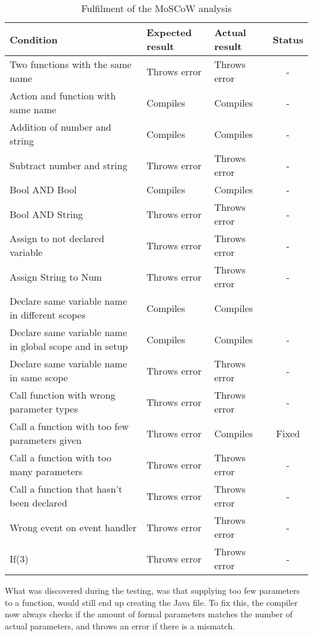 \begin{table}[H]
\centering
\begin{tabular}{ |p{4cm}|p{4cm}|p{4cm}|c| }
\hline
\textbf{Condition} & \textbf{Expected result} & \textbf{Actual result} & \textbf{Status} \\ \hline
Two functions with the same name & Throws error & Throws error & - \\ \hline
Action and function with same name & Compiles & Compiles & - \\ \hline
Addition of number and string & Compiles & Compiles & - \\ \hline
Subtract number and string & Throws error & Throws error & - \\ \hline
Bool AND Bool & Compiles & Compiles & - \\ \hline
Bool AND String & Throws error & Throws error & - \\ \hline
Assign to not declared variable & Throws error & Throws error & - \\ \hline
Assign String to Num & Throws error & Throws error & - \\ \hline
Declare same variable name in different scopes & Compiles & Compiles & \\ \hline
Declare same variable name in global scope and in setup & Compiles & Compiles & - \\ \hline
Declare same variable name in same scope & Throws error & Throws error & - \\ \hline
Call function with wrong parameter types & Throws error & Throws error & - \\ \hline
Call a function with too few parameters given & Throws error & Compiles & Fixed \\ \hline
 Call a function with too many parameters & Throws error & Throws error & - \\ \hline
Call a function that hasn’t been declared & Throws error & Throws error & - \\ \hline
Wrong event on event handler & Throws error & Throws error & -  \\ \hline
If(3) & Throws error & Throws error & - \\
\hline
\end{tabular}
\caption{Fulfilment of the MoSCoW analysis}
\label{tests}

\end{table}

What was discovered during the testing, was that supplying too few parameters to a function, would still end up creating the Java file.
To fix this, the compiler now always checks if the amount of formal parameters matches the number of actual parameters, and throws an error if there is a mismatch. 